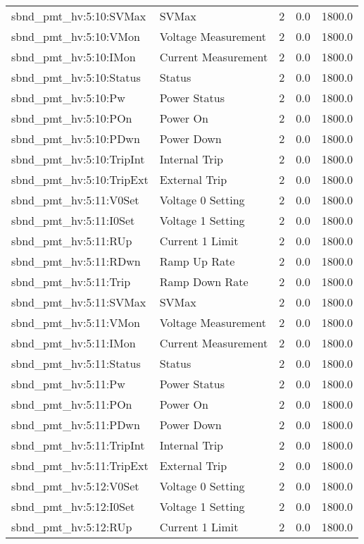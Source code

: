 \begin{center}
\begin{longtable}{l | l l l l }
sbnd\_pmt\_hv:5:10:SVMax & SVMax & 2 & 0.0 & 1800.0\\ 
sbnd\_pmt\_hv:5:10:VMon & Voltage Measurement & 2 & 0.0 & 1800.0\\ 
sbnd\_pmt\_hv:5:10:IMon & Current Measurement & 2 & 0.0 & 1800.0\\ 
sbnd\_pmt\_hv:5:10:Status & Status & 2 & 0.0 & 1800.0\\ 
sbnd\_pmt\_hv:5:10:Pw & Power Status & 2 & 0.0 & 1800.0\\ 
sbnd\_pmt\_hv:5:10:POn & Power On & 2 & 0.0 & 1800.0\\ 
sbnd\_pmt\_hv:5:10:PDwn & Power Down & 2 & 0.0 & 1800.0\\ 
sbnd\_pmt\_hv:5:10:TripInt & Internal Trip & 2 & 0.0 & 1800.0\\ 
sbnd\_pmt\_hv:5:10:TripExt & External Trip & 2 & 0.0 & 1800.0\\ 
sbnd\_pmt\_hv:5:11:V0Set & Voltage 0 Setting & 2 & 0.0 & 1800.0\\ 
sbnd\_pmt\_hv:5:11:I0Set & Voltage 1 Setting & 2 & 0.0 & 1800.0\\ 
sbnd\_pmt\_hv:5:11:RUp & Current 1 Limit & 2 & 0.0 & 1800.0\\ 
sbnd\_pmt\_hv:5:11:RDwn & Ramp Up Rate & 2 & 0.0 & 1800.0\\ 
sbnd\_pmt\_hv:5:11:Trip & Ramp Down Rate & 2 & 0.0 & 1800.0\\ 
sbnd\_pmt\_hv:5:11:SVMax & SVMax & 2 & 0.0 & 1800.0\\ 
sbnd\_pmt\_hv:5:11:VMon & Voltage Measurement & 2 & 0.0 & 1800.0\\ 
sbnd\_pmt\_hv:5:11:IMon & Current Measurement & 2 & 0.0 & 1800.0\\ 
sbnd\_pmt\_hv:5:11:Status & Status & 2 & 0.0 & 1800.0\\ 
sbnd\_pmt\_hv:5:11:Pw & Power Status & 2 & 0.0 & 1800.0\\ 
sbnd\_pmt\_hv:5:11:POn & Power On & 2 & 0.0 & 1800.0\\ 
sbnd\_pmt\_hv:5:11:PDwn & Power Down & 2 & 0.0 & 1800.0\\ 
sbnd\_pmt\_hv:5:11:TripInt & Internal Trip & 2 & 0.0 & 1800.0\\ 
sbnd\_pmt\_hv:5:11:TripExt & External Trip & 2 & 0.0 & 1800.0\\ 
sbnd\_pmt\_hv:5:12:V0Set & Voltage 0 Setting & 2 & 0.0 & 1800.0\\ 
sbnd\_pmt\_hv:5:12:I0Set & Voltage 1 Setting & 2 & 0.0 & 1800.0\\ 
sbnd\_pmt\_hv:5:12:RUp & Current 1 Limit & 2 & 0.0 & 1800.0\\ 

\end{longtable}
\end{center}
